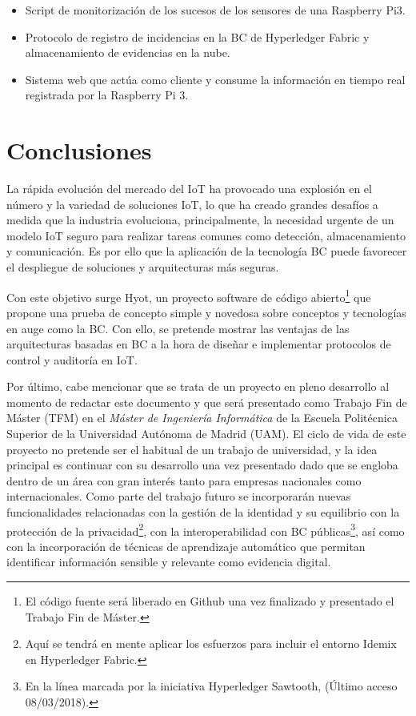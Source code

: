 \documentclass[10pt,conference,a4paper]{IEEEtran}
\begin{document}
\begin{itemize}
  \item Script de monitorización de los sucesos de los sensores de una
    Raspberry Pi3.
  \item Protocolo de registro de incidencias en la BC de Hyperledger
    Fabric y almacenamiento de evidencias en la nube. 
  \item Sistema web que actúa como cliente y consume la
          información en tiempo real registrada por la Raspberry Pi 3.
\end{itemize}

\section{Conclusiones}

La rápida evolución del mercado del IoT ha provocado una explosión en
el número y la variedad de soluciones IoT, lo que ha creado grandes
desafíos a medida que la industria evoluciona, principalmente, la
necesidad urgente de un modelo IoT seguro para realizar tareas comunes
como detección, almacenamiento y comunicación. Es por ello que la
aplicación de la tecnología BC puede favorecer el despliegue de
soluciones y arquitecturas más seguras.

Con este objetivo surge Hyot, un proyecto software de código
abierto\footnote{El código fuente será liberado en Github una vez
  finalizado y presentado el Trabajo Fin de Máster.} que propone una
prueba de concepto simple y novedosa sobre conceptos y tecnologías en
auge como la BC. Con ello, se pretende mostrar las ventajas de las
arquitecturas basadas en BC a la hora de diseñar e implementar
protocolos de control y auditoría en IoT.

Por último, cabe mencionar que se trata de un proyecto en pleno
desarrollo al momento de redactar este documento y que será presentado
como Trabajo Fin de Máster (TFM) en el \textit{Máster de Ingeniería
  Informática} de la Escuela Politécnica Superior de la Universidad
Autónoma de Madrid (UAM). El ciclo de vida de este proyecto no pretende ser el
habitual de un trabajo de universidad, y la idea principal es continuar
con su desarrollo una vez presentado dado que se engloba dentro de un
área con  gran interés tanto para empresas nacionales como
internacionales. Como parte del trabajo futuro se incorporarán nuevas
funcionalidades relacionadas con la gestión de la identidad y su
equilibrio con la protección de la privacidad\footnote{Aquí se tendrá
  en mente aplicar los esfuerzos para incluir el entorno Idemix en
  Hyperledger Fabric.}, con la interoperabilidad con BC
públicas\footnote{En la línea marcada por la iniciativa Hyperledger
  Sawtooth, \cite{JNIC2018_5}
  (Último acceso 08/03/2018).}, así como con la incorporación de técnicas de
aprendizaje automático  que permitan identificar información sensible
y relevante como evidencia digital. 
 
\end{document}

